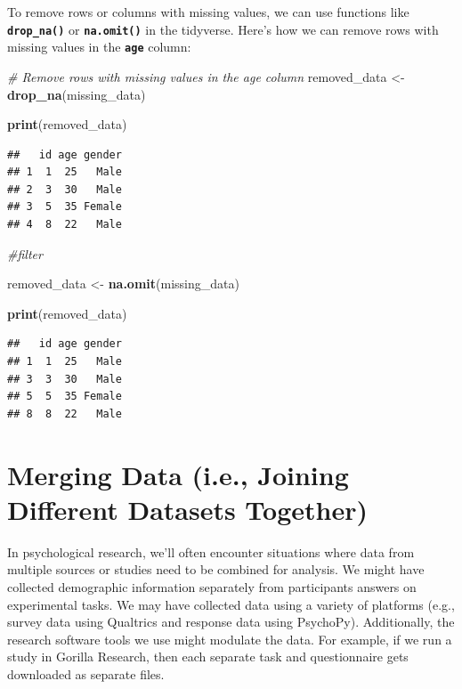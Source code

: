 \documentclass[
]{book}
\newenvironment{Shaded}{\begin{snugshade}}{\end{snugshade}}
\newcommand{\CommentTok}[1]{\textcolor[rgb]{0.56,0.35,0.01}{\textit{#1}}}
\newcommand{\FunctionTok}[1]{\textcolor[rgb]{0.13,0.29,0.53}{\textbf{#1}}}
\newcommand{\NormalTok}[1]{#1}
\newcommand{\OtherTok}[1]{\textcolor[rgb]{0.56,0.35,0.01}{#1}}
\begin{document}
To remove rows or columns with missing values, we can use functions like \textbf{\texttt{drop\_na()}} or \textbf{\texttt{na.omit()}} in the tidyverse. Here's how we can remove rows with missing values in the \textbf{\texttt{age}} column:

\begin{Shaded}
\begin{Highlighting}[]
\CommentTok{\# Remove rows with missing values in the age column}
\NormalTok{removed\_data }\OtherTok{\textless{}{-}} \FunctionTok{drop\_na}\NormalTok{(missing\_data)}

\FunctionTok{print}\NormalTok{(removed\_data)}
\end{Highlighting}
\end{Shaded}

\begin{verbatim}
##   id age gender
## 1  1  25   Male
## 2  3  30   Male
## 3  5  35 Female
## 4  8  22   Male
\end{verbatim}

\begin{Shaded}
\begin{Highlighting}[]
\CommentTok{\#filter}

\NormalTok{removed\_data }\OtherTok{\textless{}{-}} \FunctionTok{na.omit}\NormalTok{(missing\_data)}

\FunctionTok{print}\NormalTok{(removed\_data)}
\end{Highlighting}
\end{Shaded}

\begin{verbatim}
##   id age gender
## 1  1  25   Male
## 3  3  30   Male
## 5  5  35 Female
## 8  8  22   Male
\end{verbatim}

\hypertarget{merging-data-i.e.-joining-different-datasets-together}{%
\section{Merging Data (i.e., Joining Different Datasets Together)}\label{merging-data-i.e.-joining-different-datasets-together}}

In psychological research, we'll often encounter situations where data from multiple sources or studies need to be combined for analysis. We might have collected demographic information separately from participants answers on experimental tasks. We may have collected data using a variety of platforms (e.g., survey data using Qualtrics and response data using PsychoPy). Additionally, the research software tools we use might modulate the data. For example, if we run a study in Gorilla Research, then each separate task and questionnaire gets downloaded as separate files.
\end{document}
